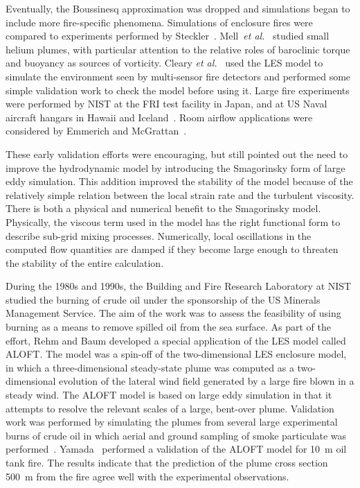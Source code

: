 Eventually, the  Boussinesq approximation was  dropped and simulations began  to   include  more  fire-specific   phenomena.  Simulations  of
enclosure   fires   were   compared   to  experiments   performed   by Steckler~\cite{McGrattan:4}.  Mell~{\em  et al.}~\cite{Mell:1} studied small
helium  plumes, with particular attention to  the relative roles of  baroclinic torque and  buoyancy as  sources of  vorticity.  Cleary {\em  et
al.}~\cite{LES:6}  used   the  LES  model  to  simulate  the environment  seen by  multi-sensor fire  detectors and  performed some simple validation
work to check the model before using it.  Large fire experiments were performed by NIST  at the FRI test facility in Japan, and at US Naval aircraft
hangars in Hawaii and Iceland~\cite{Davis:1}. Room   airflow   applications   were   considered  by   Emmerich   and
McGrattan~\cite{Emmerich:1,Emmerich:2}.

These early validation efforts were encouraging, but still pointed out the  need  to  improve  the  hydrodynamic  model  by  introducing  the
Smagorinsky form of large eddy simulation.  This addition improved the stability  of the  model  because of  the  relatively simple  relation between
the  local strain rate  and the turbulent viscosity.  There is both   a   physical  and   numerical   benefit   to  the   Smagorinsky model.
Physically,  the viscous term used  in the model  has the right functional  form to describe  sub-grid mixing  processes. Numerically, local
oscillations in the computed  flow quantities are damped if they become  large   enough  to  threaten  the  stability   of  the  entire calculation.

During the 1980s and 1990s,  the Building and Fire Research Laboratory at NIST studied the burning of  crude oil under the sponsorship of the US
Minerals Management Service.  The aim of the work was to assess the feasibility of using burning as a means to remove spilled oil from the sea
surface. As part of the  effort, Rehm and Baum developed a special application of the LES model called ALOFT. The model was a spin-off of the
two-dimensional LES enclosure  model, in which a three-dimensional steady-state plume was computed  as a two-dimensional evolution of the lateral
wind field  generated by a large fire blown  in a steady wind. The ALOFT model is based on  large eddy simulation in that it attempts to resolve the
relevant scales of a large, bent-over plume. Validation work  was  performed  by  simulating  the plumes  from  several  large experimental burns of
crude oil in which aerial and ground sampling of smoke       particulate       was       performed~\cite{McGrattan:4a}. Yamada~\cite{ALOFT:2}
performed  a validation  of the ALOFT  model for 10~m oil  tank fire. The results  indicate that the  prediction of the plume  cross  section  500~m
from   the  fire  agree  well  with  the experimental observations.




